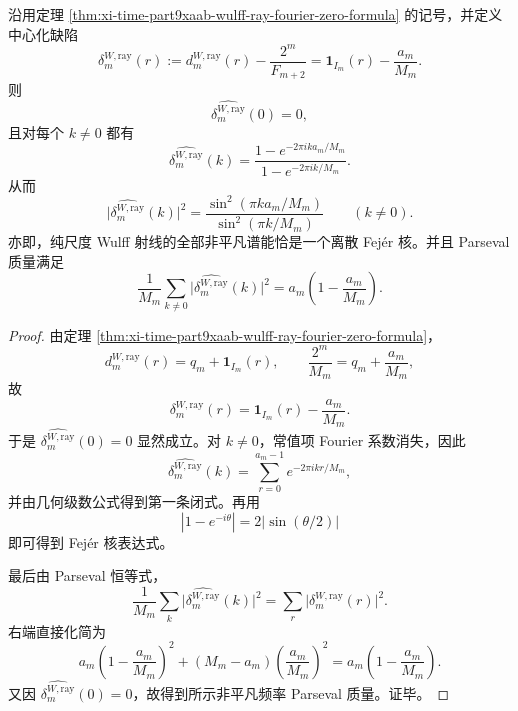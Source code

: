 \begin{theorem}\label{thm:xi-time-part9xaab-wulff-ray-fejer-kernel}
沿用定理 \ref{thm:xi-time-part9xaab-wulff-ray-fourier-zero-formula} 的记号，并定义中心化缺陷
\[
\delta_m^{W,\mathrm{ray}}(r)
:=
d_m^{W,\mathrm{ray}}(r)-\frac{2^m}{F_{m+2}}
=
\mathbf 1_{I_m}(r)-\frac{a_m}{M_m}.
\]
则
\[
\widehat{\delta_m^{W,\mathrm{ray}}}(0)=0,
\]
且对每个 \(k\neq 0\) 都有
\[
\widehat{\delta_m^{W,\mathrm{ray}}}(k)
=
\frac{1-e^{-2\pi i ka_m/M_m}}{1-e^{-2\pi i k/M_m}}.
\]
从而
\[
\bigl|\widehat{\delta_m^{W,\mathrm{ray}}}(k)\bigr|^2
=
\frac{\sin^2(\pi ka_m/M_m)}{\sin^2(\pi k/M_m)}
\qquad(k\neq 0).
\]
亦即，纯尺度 Wulff 射线的全部非平凡谱能恰是一个离散 Fej\'er 核。并且 Parseval 质量满足
\[
\frac{1}{M_m}
\sum_{k\neq 0}
\bigl|\widehat{\delta_m^{W,\mathrm{ray}}}(k)\bigr|^2
=
a_m\left(1-\frac{a_m}{M_m}\right).
\]
\end{theorem}
\begin{proof}
由定理 \ref{thm:xi-time-part9xaab-wulff-ray-fourier-zero-formula}，
\[
d_m^{W,\mathrm{ray}}(r)=q_m+\mathbf 1_{I_m}(r),
\qquad
\frac{2^m}{M_m}=q_m+\frac{a_m}{M_m},
\]
故
\[
\delta_m^{W,\mathrm{ray}}(r)=\mathbf 1_{I_m}(r)-\frac{a_m}{M_m}.
\]
于是 \(\widehat{\delta_m^{W,\mathrm{ray}}}(0)=0\) 显然成立。对 \(k\neq 0\)，常值项 Fourier 系数消失，因此
\[
\widehat{\delta_m^{W,\mathrm{ray}}}(k)
=
\sum_{r=0}^{a_m-1}e^{-2\pi i kr/M_m},
\]
并由几何级数公式得到第一条闭式。再用
\[
|1-e^{-i\theta}|=2\bigl|\sin(\theta/2)\bigr|
\]
即可得到 Fej\'er 核表达式。

最后由 Parseval 恒等式，
\[
\frac{1}{M_m}\sum_{k}\bigl|\widehat{\delta_m^{W,\mathrm{ray}}}(k)\bigr|^2
=
\sum_{r}\bigl|\delta_m^{W,\mathrm{ray}}(r)\bigr|^2.
\]
右端直接化简为
\[
a_m\left(1-\frac{a_m}{M_m}\right)^2
+
(M_m-a_m)\left(\frac{a_m}{M_m}\right)^2
=
a_m\left(1-\frac{a_m}{M_m}\right).
\]
又因 \(\widehat{\delta_m^{W,\mathrm{ray}}}(0)=0\)，故得到所示非平凡频率 Parseval 质量。证毕。
\end{proof}

